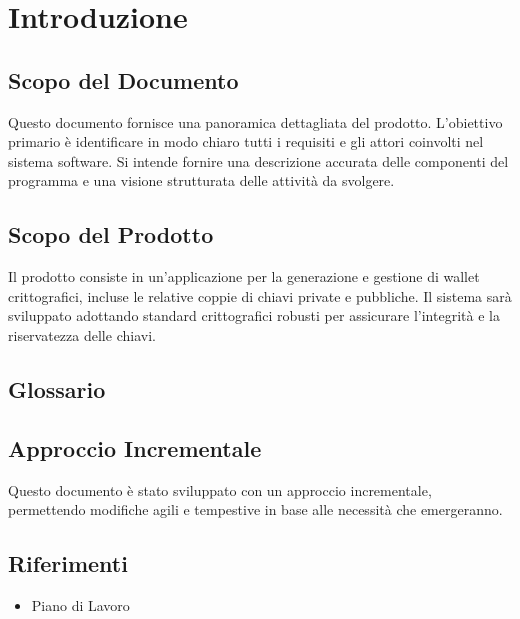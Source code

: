 \section{Introduzione}

\subsection{Scopo del Documento}
Questo documento fornisce una panoramica dettagliata del prodotto.
 L'obiettivo primario è identificare in modo chiaro tutti i requisiti e gli attori 
 coinvolti nel sistema software.  Si intende fornire una descrizione accurata delle
  componenti del programma e una visione strutturata delle attività da svolgere.

\subsection{Scopo del Prodotto}
Il prodotto consiste in un'applicazione per la generazione e gestione di wallet
 crittografici, incluse le relative coppie di chiavi private e pubbliche.
  Il sistema sarà sviluppato adottando standard crittografici robusti per assicurare 
  l'integrità e la riservatezza delle chiavi.

\subsection{Glossario}

\subsection{Approccio Incrementale}
Questo documento è stato sviluppato con un approccio incrementale,
 permettendo modifiche agili e tempestive in base alle necessità che emergeranno.

\subsection{Riferimenti}
\begin{itemize}
    \item Piano di Lavoro
\end{itemize}
